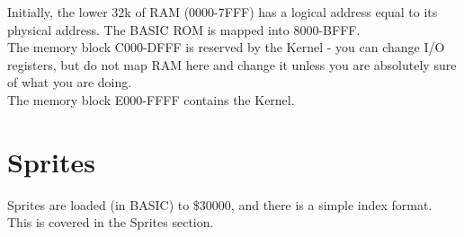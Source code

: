 Initially, the lower 32k of RAM (0000-7FFF) has a logical address equal to its physical address. The BASIC ROM is mapped into 8000-BFFF. \\

The memory block C000-DFFF is reserved by the Kernel - you can change I/O registers, but do not map RAM here and change it unless you are absolutely sure of what you are doing.\\

The memory block E000-FFFF contains the Kernel.

\section{Sprites}
Sprites are loaded (in BASIC) to \$30000, and there is a simple index format. This is covered in the Sprites section.
